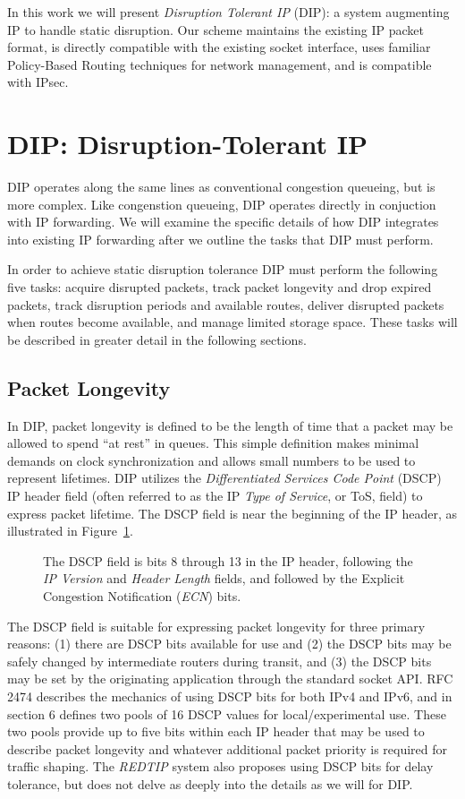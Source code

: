 \documentclass[10pt,letterpaper]{article}
\begin{document}
In this work we will present {\em Disruption Tolerant IP} (DIP): a system
augmenting IP to handle static disruption. Our scheme maintains the
existing IP packet format, is directly compatible with the existing
socket interface, uses familiar Policy-Based Routing techniques for 
network management, and is compatible with IPsec. 

\section{DIP: Disruption-Tolerant IP}
DIP operates along the same lines as conventional
congestion queueing, but is more complex. Like congenstion queueing,
DIP operates directly in conjuction with IP forwarding.
We will examine the specific details of how DIP integrates into
existing IP forwarding after we outline the tasks that DIP
must perform.

In order to achieve static disruption
tolerance DIP must perform the following five tasks:
acquire disrupted packets, track packet longevity and drop
expired packets, track disruption periods and available routes,
deliver disrupted packets when routes become available,
and manage limited storage space. These tasks will be described in
greater detail in the following sections.

\subsection{Packet Longevity}
In DIP, packet longevity is defined to be the length of
time that a packet may be allowed to spend ``at rest'' in queues.
This simple definition makes minimal demands on clock synchronization and
allows small numbers to be used to represent lifetimes. 
DIP utilizes the {\em Differentiated Services Code Point} (DSCP) IP header
field (often referred to as the IP {\em Type of Service}, or ToS, field)
to express packet lifetime. The DSCP field is near the beginning of the 
IP header, as illustrated in Figure~\ref{figure:dscp_field}.
\begin{figure}
\centerline{
}
\caption{\footnotesize The DSCP field is bits 8 through 13 in the IP header,
following the {\em IP Version} and {\em Header Length} fields, and followed
by the Explicit Congestion Notification ({\em ECN}) bits.}
\label{figure:dscp_field}
\end{figure}

The DSCP field is suitable for expressing
packet longevity for three primary reasons: (1) there are DSCP bits available
for use and (2) the DSCP bits may be safely changed by intermediate
routers during transit, and (3) the DSCP bits may be set by the
originating application through the standard socket API.
RFC 2474\cite{2474:rfc} describes the mechanics
of using DSCP bits for both IPv4 and IPv6, and in section 6 defines two pools
of 16 DSCP values for local/experimental use. These two pools provide
up to five bits within each IP header that may be used to describe
packet longevity and whatever additional packet priority is required for
traffic shaping. The {\em REDTIP} \cite{redtip} system also proposes
using DSCP bits for delay tolerance, but does not delve as deeply
into the details as we will for DIP.
\end{document}

